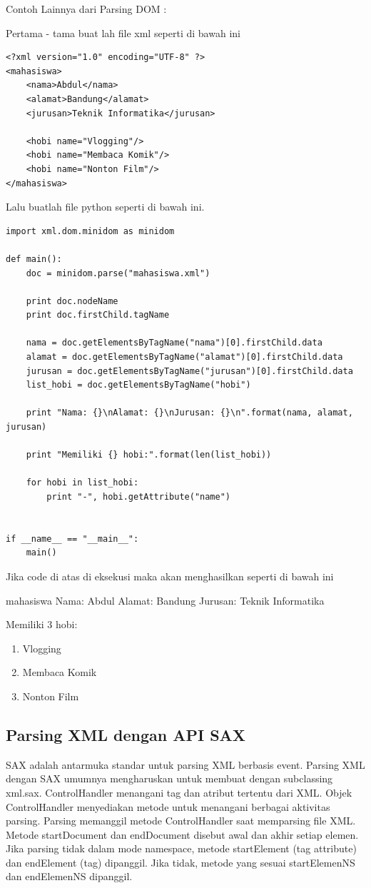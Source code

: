Contoh Lainnya dari Parsing DOM : 

Pertama - tama buat lah file xml seperti di bawah ini
\begin{verbatim}
<?xml version="1.0" encoding="UTF-8" ?>
<mahasiswa>
    <nama>Abdul</nama>
	<alamat>Bandung</alamat>
	<jurusan>Teknik Informatika</jurusan>

	<hobi name="Vlogging"/>
	<hobi name="Membaca Komik"/>
	<hobi name="Nonton Film"/>
</mahasiswa>
\end{verbatim}

Lalu buatlah file python seperti di bawah ini.
\begin{verbatim}
import xml.dom.minidom as minidom

def main():
    doc = minidom.parse("mahasiswa.xml")

    print doc.nodeName
    print doc.firstChild.tagName

    nama = doc.getElementsByTagName("nama")[0].firstChild.data
    alamat = doc.getElementsByTagName("alamat")[0].firstChild.data
    jurusan = doc.getElementsByTagName("jurusan")[0].firstChild.data
    list_hobi = doc.getElementsByTagName("hobi")

    print "Nama: {}\nAlamat: {}\nJurusan: {}\n".format(nama, alamat, jurusan)

    print "Memiliki {} hobi:".format(len(list_hobi))

    for hobi in list_hobi:
        print "-", hobi.getAttribute("name")


if __name__ == "__main__":
    main()
\end{verbatim}

Jika code di atas di eksekusi maka akan menghasilkan seperti di bawah ini

mahasiswa
Nama: Abdul
Alamat: Bandung
Jurusan: Teknik Informatika

Memiliki 3 hobi:
\begin{enumerate}
  \item Vlogging
  \item Membaca Komik
  \item Nonton Film
\end{enumerate}

\subsection{Parsing XML dengan API SAX}
  SAX adalah antarmuka standar untuk parsing XML berbasis event. Parsing XML dengan SAX umumnya mengharuskan untuk membuat dengan subclassing xml.sax.
  ControlHandler menangani tag dan atribut tertentu dari XML. Objek ControlHandler menyediakan metode untuk menangani berbagai aktivitas parsing. Parsing memanggil metode ControlHandler saat memparsing file XML.
  Metode startDocument dan endDocument disebut awal dan akhir setiap elemen. Jika parsing tidak dalam mode namespace, metode startElement (tag attribute) dan endElement (tag) dipanggil. Jika tidak, metode yang sesuai startElemenNS dan endElemenNS dipanggil. 

